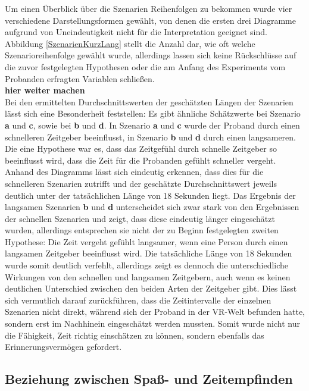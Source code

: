 \documentclass{Paper}
\begin{document}
Um einen Überblick über die Szenarien Reihenfolgen zu bekommen wurde vier verschiedene Darstellungsformen gewählt, von denen die ersten drei Diagramme aufgrund von Uneindeutigkeit nicht für die Interpretation geeignet sind. Abbildung \ref{SzenarienKurzLang} stellt die Anzahl dar, wie oft welche Szenarioreihenfolge gewählt wurde, allerdings lassen sich keine Rückschlüsse auf die zuvor festgelegten Hypothesen oder die am Anfang des Experiments vom Probanden erfragten Variablen schließen.\\ \textbf{hier weiter machen}\\
Bei den ermittelten Durchschnittswerten der
geschätzten Längen der Szenarien lässt sich eine Besonderheit feststellen:
Es gibt ähnliche Schätzwerte bei Szenario \textbf{a} und \textbf{c}, sowie bei
\textbf{b} und \textbf{d}. In Szenario
\textbf{a} und \textbf{c} wurde der Proband durch einen schnelleren Zeitgeber
beeinflusst, in Szenario \textbf{b} und \textbf{d} durch einen langsameren.
Die eine Hypothese war es, dass das Zeitgefühl durch schnelle Zeitgeber so beeinflusst
wird, dass die Zeit für die Probanden gefühlt schneller vergeht. Anhand des
Diagramms lässt sich eindeutig erkennen, dass dies für die schnelleren Szenarien
zutrifft und der geschätzte Durchschnittswert jeweils deutlich unter der
tatsächlichen Länge von 18 Sekunden liegt. Das Ergebnis der langsamen Szenarien \textbf{b} und
\textbf{d} unterscheidet sich zwar stark von den Ergebnissen der schnellen
Szenarien und zeigt, dass diese eindeutig länger eingeschätzt wurden, allerdings
entsprechen sie nicht der zu Beginn festgelegten zweiten Hypothese: Die Zeit vergeht 
gefühlt langsamer, wenn eine Person durch einen langsamen Zeitgeber beeinflusst wird. Die
tatsächliche Länge von 18 Sekunden wurde somit deutlich verfehlt, allerdings zeigt es dennoch
die unterschiedliche Wirkungen von den schnellen und langsamen Zeitgebern, auch wenn es keinen
deutlichen Unterschied zwischen den beiden Arten der Zeitgeber gibt. Dies lässt sich vermutlich
darauf zurückführen, dass die Zeitintervalle der einzelnen Szenarien nicht direkt, während sich
der Proband in der VR-Welt befunden hatte, sondern erst im Nachhinein eingeschätzt werden mussten.
Somit wurde nicht nur die Fähigkeit, Zeit richtig einschätzen zu können, sondern
ebenfalls das Erinnerungsvermögen gefordert.

\subsection{Beziehung zwischen Spaß- und Zeitempfinden}
\end{document}
